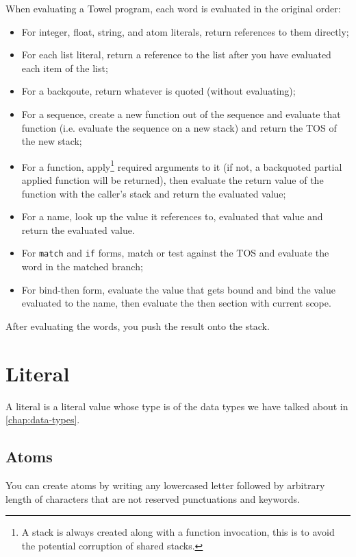 \documentclass{book}
\begin{document}
When evaluating a Towel program, each word is evaluated in the original order:
\begin{itemize}
\item For integer, float, string, and atom literals, return references to them directly;
\item For each list literal, return a reference to the list after you have evaluated each item of the list;
\item For a backqoute, return whatever is quoted (without evaluating);
\item For a sequence, create a new function out of the sequence and evaluate that function (i.e. evaluate the sequence on a new stack) and return the TOS of the new stack;
\item For a function, apply\footnote{A stack is always created along with a function invocation, this is to avoid the potential corruption of shared stacks.} required arguments to it (if not, a backquoted partial applied function will be returned), then evaluate the return value of the function with the caller's stack and return the evaluated value;
\item For a name, look up the value it references to, evaluated that value and return the evaluated value.
\item For \texttt{match} and \texttt{if} forms, match or test against the TOS and evaluate the word in the matched branch;
\item For bind-then form, evaluate the value that gets bound and bind the value evaluated to the name, then evaluate the then section with current scope.
\end{itemize}

After evaluating the words, you push the result onto the stack.

\section{Literal}

A literal is a literal value whose type is of the data types we have talked about in \autoref{chap:data-types}.

\subsection{Atoms}

You can create atoms by writing any lowercased letter followed by arbitrary length of characters that are not reserved punctuations and keywords.
\end{document}
